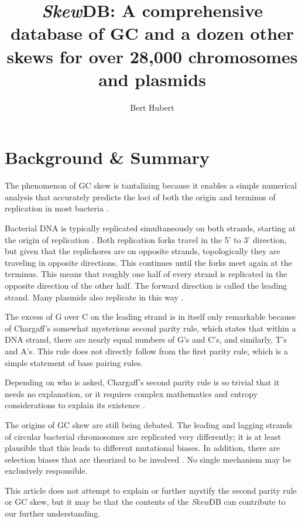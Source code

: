 \documentclass[fleqn,10pt]{wlscirep}
\title{\emph{Skew}DB: A comprehensive database of GC and a dozen other skews for over 28,000 chromosomes and plasmids}
\author[*]{Bert Hubert}
\affil[*]{corresponding author: Bert Hubert (bert@hubertnet.nl)}
\begin{document}
\flushbottom
\maketitle
\thispagestyle{empty}

\section*{Background \& Summary}
The phenomenon of GC skew is tantalizing because it enables a simple numerical analysis that accurately predicts the loci of both the origin and terminus of replication in most bacteria \cite{lu_skewit_2020} \cite{luo_doric_2019}.

Bacterial DNA is typically replicated simultaneously on both strands, starting at the origin of replication \cite{ODonnell2013}. Both replication forks travel in the 5' to 3' direction, but given that the replichores are on opposite strands, topologically they are traveling in opposite directions. This continues until the forks meet again at the terminus. This means that roughly one half of every strand is replicated in the opposite direction of the other half. The forward direction is called the leading strand. Many plasmids also replicate in this way \cite{Lilly2015}.

The excess of G over C on the leading strand is in itself only remarkable because of Chargaff's somewhat mysterious second parity rule\cite{rudner_separation_1968}, which states that within a DNA strand, there are nearly equal numbers of G's and C's, and similarly, T's and A's. This rule does not directly follow from the first parity rule, which is a simple statement of base pairing rules.

Depending on who is asked, Chargaff's second parity rule is so trivial that it needs no explanation, or it requires complex mathematics and entropy considerations to explain its existence \cite{fariselli_dna_2020}.

The origins of GC skew are still being debated. The leading and lagging strands of circular bacterial chromosomes are replicated very differently; it is at least plausible that this leads to different mutational biases. In addition, there are selection biases that are theorized to be involved \cite{tillier_contributions_2000}. No single mechanism may be exclusively responsible.

This article does not attempt to explain or further mystify \cite{zhang_brief_2014} the second parity rule or GC skew, but it may be that the contents of the \emph{Skew}DB can contribute to our further understanding.
\end{document}
